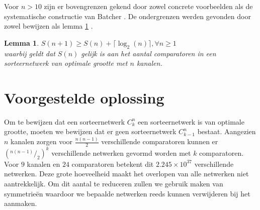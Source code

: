 \documentclass{article}
\newtheorem{lemma}{Lemma}
\begin{document}
Voor $n > 10$ zijn er bovengrenzen gekend door zowel concrete voorbeelden als de systematische constructie van Batcher \cite{sortingNetworksApplications}. 
De ondergrenzen werden gevonden door zowel bewijzen als lemma \ref{lemma1} \cite{Voorhis1972}.
\begin{lemma}
	$S(n+1) \geq S(n) + \lceil \log_2(n) \rceil, \forall n \geq 1$\\
	waarbij geldt dat $S(n)$ gelijk is aan het aantal comparatoren in een sorteernetwerk van optimale grootte met $n$ kanalen.
	\label{lemma1}
\end{lemma}

\newcommand*\rfrac[2]{{}^{#1}\!/_{#2}}
\section{Voorgestelde oplossing}\label{VoorgesteldeOplossing}
Om te bewijzen dat een sorteernetwerk $C^n_k$ een sorteernetwerk is van optimale grootte, moeten we bewijzen dat er geen sorteernetwerk $C^n_{k-1}$ bestaat.
Aangezien $n$ kanalen zorgen voor $\frac{n \left(n-1\right)}{2}$ verschillende comparatoren kunnen er $\left(\rfrac{n \left(n-1\right)}{2}\right) ^k$ verschillende netwerken gevormd worden met  $k$ comparatoren.
Voor $9$ kanalen en $24$ comparatoren betekent dit $2.245 \times 10^{37}$ verschillende netwerken.
Deze grote hoeveelheid maakt het overlopen van alle netwerken niet aantrekkelijk.
Om dit aantal te reduceren zullen we gebruik maken van symmetrie\"en waardoor we bepaalde netwerken reeds kunnen verwijderen bij het aanmaken.
\end{document}
